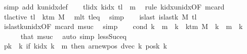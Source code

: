 \begin{isabellebody}
\ {\isacharparenleft}{\kern0pt}simp\ add{\isacharcolon}{\kern0pt}\ k{\isacharunderscore}{\kern0pt}unidx{\isacharunderscore}{\kern0pt}def{\isacharparenright}{\kern0pt}\isanewline
\ \ \isamarkupfalse%
\ tlidx{\isacharcolon}{\kern0pt}\ {\isachardoublequoteopen}k{\isacharunderscore}{\kern0pt}idx\ {\isacharquery}{\kern0pt}tl\ {\isacharequal}{\kern0pt}\ {\isacharquery}{\kern0pt}m{}{\isachardoublequoteclose}\ \isamarkupfalse%
\ {\isacharparenleft}{\kern0pt}rule\ k{\isacharunderscore}{\kern0pt}idx{\isacharunderscore}{\kern0pt}unidx{\isacharbrackleft}{\kern0pt}OF\ m{}card{\isacharbrackright}{\kern0pt}{\isacharparenright}{\kern0pt}\isanewline
\ \ \isamarkupfalse%
\ tl{\isacharunderscore}{\kern0pt}active{\isacharcolon}{\kern0pt}\ {\isachardoublequoteopen}{\isacharquery}{\kern0pt}tl\ {\isacharless}{\kern0pt}\ k{\isacharunderscore}{\kern0pt}tm\ M{\isachardoublequoteclose}\ \isamarkupfalse%
\ m{}lt\ tl{\isacharunderscore}{\kern0pt}eq\ \isamarkupfalse%
\ simp\isanewline
\ \ \isamarkupfalse%
\ islast{\isacharcolon}{\kern0pt}\ {\isachardoublequoteopen}is{\isacharunderscore}{\kern0pt}last{\isacharunderscore}{\kern0pt}k\ M\ {\isacharquery}{\kern0pt}tl{\isachardoublequoteclose}\ \isamarkupfalse%
\ is{\isacharunderscore}{\kern0pt}last{\isacharunderscore}{\kern0pt}k{\isacharunderscore}{\kern0pt}unidx{\isacharbrackleft}{\kern0pt}OF\ m{}card{\isacharbrackright}{\kern0pt}\ m{}suc\ \isamarkupfalse%
\ simp\isanewline
\ \ \isamarkupfalse%
\ cond{\isacharcolon}{\kern0pt}\ {\isachardoublequoteopen}{\isacharparenleft}{\kern0pt}k\ {\isacharless}{\kern0pt}\ {\isacharquery}{\kern0pt}m{}{\isacharparenright}{\kern0pt}\ {\isacharequal}{\kern0pt}\ {\isacharparenleft}{\kern0pt}k\ {\isacharless}{\kern0pt}\ k{\isacharunderscore}{\kern0pt}tm\ M{\isacharparenright}{\kern0pt}{\isachardoublequoteclose}\ \ {\isachardoublequoteopen}k\ {\isasymnoteq}\ {\isacharquery}{\kern0pt}m{}{\isachardoublequoteclose}\ \ k\isanewline
\ \ \ \ \isamarkupfalse%
\ that\ m{}suc\ \isamarkupfalse%
\ {\isacharparenleft}{\kern0pt}auto\ simp{\isacharcolon}{\kern0pt}\ less{\isacharunderscore}{\kern0pt}Suc{\isacharunderscore}{\kern0pt}eq{\isacharparenright}{\kern0pt}\isanewline
\ \ \isamarkupfalse%
\ {\isacharquery}{\kern0pt}pk\ {\isacharequal}{\kern0pt}\ {\isachardoublequoteopen}{\isasymlambda}k{\isachardot}{\kern0pt}\ if\ k{\isacharunderscore}{\kern0pt}idx\ k\ {\isacharless}{\kern0pt}\ {\isacharquery}{\kern0pt}m{}\ then\ ar{\isacharunderscore}{\kern0pt}newpos\ {\isacharparenleft}{\kern0pt}dvec\ k{\isacharparenright}{\kern0pt}\ {\isacharparenleft}{\kern0pt}posk{}\ k{\isacharparenright}{\kern0pt}\isanewline

\end{isabellebody}
